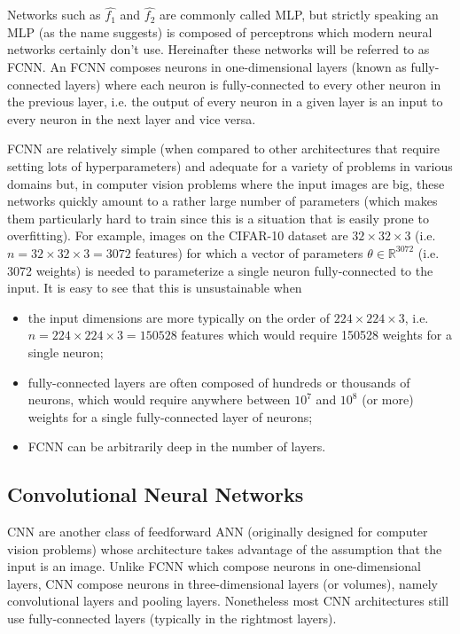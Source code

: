 Networks such as $\hat{f_1}$ and $\hat{f_2}$ are commonly called \ac{MLP}, but strictly speaking an \ac{MLP} (as the name suggests) is composed of perceptrons which modern neural networks certainly don't use. Hereinafter these networks will be referred to as \ac{FCNN}. An \ac{FCNN} composes neurons in one-dimensional layers (known as fully-connected layers) where each neuron is fully-connected to every other neuron in the previous layer, i.e. the output of every neuron in a given layer is an input to every neuron in the next layer and vice versa.

\ac{FCNN} are relatively simple (when compared to other architectures that require setting lots of hyperparameters) and adequate for a variety of problems in various domains but, in computer vision problems where the input images are big, these networks quickly amount to a rather large number of parameters (which makes them particularly hard to train since this is a situation that is easily prone to overfitting). For example, images on the CIFAR-10 \cite{cifar10} dataset are $32 \times 32 \times 3$ (i.e. $n = 32 \times 32 \times 3 = 3072$ features) for which a vector of parameters $\theta \in \mathbb{R}^{3072}$ (i.e. 3072 weights) is needed to parameterize a single neuron fully-connected to the input. It is easy to see that this is unsustainable when

\begin{itemize}
    \item the input dimensions are more typically on the order of $224 \times 224 \times 3$, i.e. $n = 224 \times 224 \times 3 = 150528$ features which would require 150528 weights for a single neuron;
    \item fully-connected layers are often composed of hundreds or thousands of neurons, which would require anywhere between $10^7$ and $10^8$ (or more) weights for a single fully-connected layer of neurons;
    \item \ac{FCNN} can be arbitrarily deep in the number of layers.
\end{itemize}

\subsection{Convolutional Neural Networks}

\ac{CNN} are another class of feedforward \ac{ANN} (originally designed for computer vision problems) whose architecture takes advantage of the assumption that the input is an image. Unlike \ac{FCNN} which compose neurons in one-dimensional layers, \ac{CNN} compose neurons in three-dimensional layers (or volumes), namely convolutional layers and pooling layers. Nonetheless most \ac{CNN} architectures still use fully-connected layers (typically in the rightmost layers).

